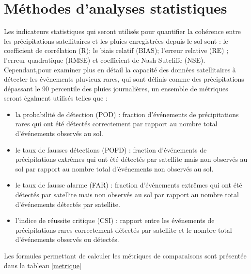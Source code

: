 
\section{Méthodes d'analyses statistiques}
Les indicateurs statistiques qui seront utilisés pour quantifier la cohérence entre les précipitations satellitaires et les pluies enregistrées depuis le sol sont : le coefficient de corrélation (R); le biais relatif (BIAS); l’erreur relative (RE) ; l’erreur quadratique (RMSE) et coefficient de Nash-Sutcliffe (NSE)\cite{fang_evaluation_2019}.\\ Cependant,pour examiner plus en détail la capacité des données satellitaires à détecter les événements pluvieux rares, qui sont d\'efinis comme  des pr\'ecipitations dépassant le 90 percentile des pluies journali\`eres, un ensemble de métriques seront \'egalment utilis\'es telles que 
:
\begin{itemize}
\item la probabilité de détection (POD) :  fraction d'événements de précipitations rares qui ont été détectés correctement par rapport au nombre total d'événements observés au sol.
\item le taux de fausses  détections (POFD) :  fraction d'événements de précipitations extrêmes qui ont été détectés par satellite mais non observ\'es au sol par rapport au nombre total d'événements non observés au sol.
\item le taux de fausse alarme (FAR) :  fraction d'événements extrêmes  qui ont été détectés par  satellite mais non observ\'es au sol par rapport  au nombre total d'événements détectés par satellite.
\item l'indice de réussite critique (CSI) : rapport entre les événements de précipitations rares correctement détectés par satellite et le nombre total d'événements observés ou détectés.
\end{itemize} 
Les formules permettant de calculer les métriques de comparaisons sont présentée dans la tableau \ref{metrique}

